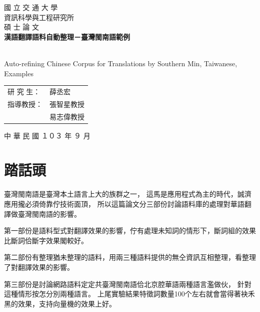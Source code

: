 \documentclass[final,oneside,onecolumn,12pt,a4paper]{book}%
\begin{document}
\begin{titlepage}

\begin{center}

   

\textsc{\Huge 國 立 交 通 大 學} %
\\[2em]
\textsc{\LARGE 資訊科學與工程研究所} %
\\[2em]
\textsc{\LARGE 碩 士 論 文} %
\\[3em]

{\huge \bfseries 漢語翻譯語料自動整理－臺灣閩南語範例 } %

\\[1em]
{\LARGE Auto-refining Chinese Corpus for Translations by Southern Min, Taiwanese, Examples}
\\[3em]

\begin{table}[H]
\centering
\Large
\begin{tabular}{ll}
研 究 生： & 薛丞宏\\ %
指導教授： & 張智星教授\\ %
 & 易志偉教授\\ %
\end{tabular}
\end{table}

\vfill

{\large 中 華 民 國  １０３  年  ９  月}

\end{center}

\end{titlepage}


\frontmatter
\chapter{踏話頭}
臺灣閩南語是臺灣本土語言上大的族群之一，
這馬是應用程式為主的時代，誠濟應用攏必須倚靠佇技術面頂，
所以這篇論文分三部份討論語料庫的處理對華語翻譯做臺灣閩南語的影響。

第一部份是語料型式對翻譯效果的影響，佇有處理未知詞的情形下，斷詞組的效果比斷詞佮斷字效果閣較好。

第二部份有整理猶未整理的語料，用兩三種語料提供的無仝資訊互相整理，看整理了對翻譯效果的影響。

第三部份是討論網路語料定定共臺灣閩南語佮北京腔華語兩種語言濫做伙，
針對這種情形按怎分別兩種語言。
上尾實驗結果特徵詞數量100个左右就會當得著袂禾黑的效果，支持向量機的效果上好。
\end{document}
